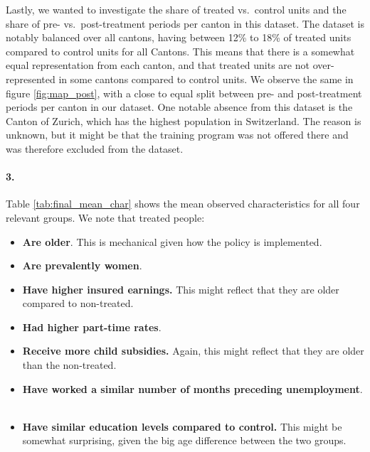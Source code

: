 \documentclass{scrartcl}
\begin{document}
Lastly, we wanted to investigate the share of treated vs.\ control units and the share of pre- vs.\ post-treatment periods per canton in this dataset. The dataset is notably balanced over all cantons, having between 12\% to 18\% of treated units compared to control units for all Cantons. This means that there is a somewhat equal representation from each canton, and that treated units are not over-represented in some cantons compared to control units. We observe the same in figure \ref{fig:map_post}, with a close to equal split between pre- and post-treatment periods per canton in our dataset. One notable absence from this dataset is the Canton of Zurich, which has the highest population in Switzerland. The reason is unknown, but it might be that the training program was not offered there and was therefore excluded from the dataset.


  
\paragraph*{3.}

Table \ref{tab:final_mean_char} shows the mean observed characteristics for all four relevant groups. We note that treated people:

\begin{itemize}[label=$\blacktriangleright$]
    \item \textbf{Are older}. This is mechanical given how the policy is implemented. \
    \item \textbf{Are prevalently women}. \
    \item \textbf{Have higher insured earnings.} This might reflect that they are older compared to non-treated. \
    \item \textbf{Had higher part-time rates}. \
    \item \textbf{Receive more child subsidies.} Again, this might reflect that they are older than the non-treated. \
    \item \textbf{Have worked a similar number of months preceding unemployment}. \ 
    \item \textbf{Have similar education levels compared to control.} This might be somewhat surprising, given the big age difference between the two groups. 
    
\end{itemize}
\end{document}
